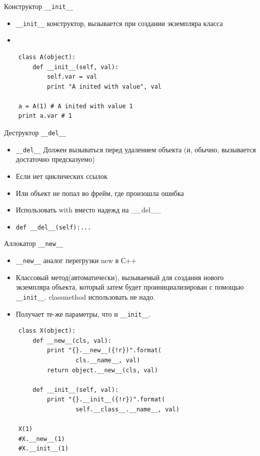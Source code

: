 \documentclass{article}
\begin{document}
\begin{center} Конструктор \lstinline!__init__! \end{center}
\begin{itemize}
    \item \lstinline!__init__! конструктор, вызывается 
        при создании экземпляра класса
    \item 
\end{itemize}
\vspace{15pt}
\begin{lstlisting}
    class A(object):
        def __init__(self, val):
            self.var = val
            print "A inited with value", val

    a = A(1) # A inited with value 1
    print a.var # 1
\end{lstlisting}
\newpage

\begin{center} Деструктор \lstinline!__del__! \end{center}
\begin{itemize}
    \item \lstinline!__del__! Должен вызываться перед удалением объекта 
        (и, обычно, вызывается достаточно предсказуемо)
    \item Если нет циклических ссылок
    \item Или объект не попал во фрейм, где произошла ошибка
    \item Использовать with вместо надежд на \_\_del\_\_
    \item \lstinline!def __del__(self):...!
\end{itemize}
\newpage

\begin{center} Аллокатор \lstinline!__new__! \end{center}
\begin{itemize}
    \item \lstinline!__new__! аналог перегрузки new в С++
    \item Классовый метод(автоматически), вызываемый для создания 
        нового экземпляра объекта, который затем будет проинициализирован 
        с помощью \lstinline!__init__!. classmethod использовать не надо.
    \item Получает те-же параметры, что и \lstinline!__init__!.
\end{itemize}
\vspace{15pt}
\begin{lstlisting}
    class X(object):
        def __new__(cls, val):
            print "{}.__new__({!r})".format(
                    cls.__name__, val)
            return object.__new__(cls, val)
        
        def __init__(self, val):
            print "{}.__init__({!r})".format(
                    self.__class__.__name__, val)

    X(1)
    #X.__new__(1)
    #X.__init__(1)
\end{lstlisting}
\end{document}
